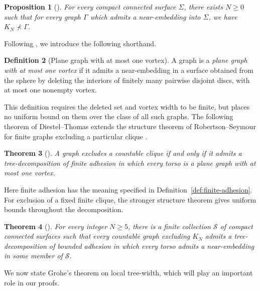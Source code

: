 \documentclass[10pt,a4paper]{amsart}
\newtheorem{theorem}{Theorem}[section]%
\newtheorem{proposition}[theorem]{Proposition}
\theoremstyle{definition}
\newtheorem{definition}[theorem]{Definition}
\begin{document}
\begin{proposition}[{\cite[Lem.~2.3]{diestel1999excluding}}]\label{prop:near-embeddings-exclude-minors}
    For every compact connected surface $\Sigma$, there exists $N \geq 0$ such that for every graph $\Gamma$ which admits a near-embedding into $\Sigma$, we have $K_N \not\prec \Gamma$.
\end{proposition}

Following \cite{diestel1999excluding}, we introduce the following shorthand. 

\begin{definition}[Plane graph with at most one vortex]\label{def:one-vortex}
A graph is a \emph{plane graph with at most one vortex} if it admits a near-embedding in a surface obtained from the sphere by deleting the interiors of finitely many pairwise disjoint discs, with at most one nonempty vortex.
\end{definition}

This definition requires the deleted set and vortex width to be finite, but places no uniform bound on them over the class of all such graphs.
The following theorem of Diestel--Thomas extends the structure theorem of Robertson--Seymour for finite graphs excluding a particular clique \cite{robertson2003graph}.



\begin{theorem}[{\cite[Thm.~3.2]{diestel1999excluding}}]\label{thm:diestel-thomas}
A graph excludes a countable clique if and only if it admits a tree-decomposition of finite adhesion in which every torso is a plane graph with at most one vortex.
\end{theorem}

Here finite adhesion has the meaning specified in Definition~\ref{def:finite-adhesion}.
For exclusion of a fixed finite clique, the stronger structure theorem gives uniform bounds throughout the decomposition.

\begin{theorem}[{\cite[Thm.~3.1, Lem.~2.3]{diestel1999excluding}}]\label{thm:finite-clique-structure}
    For every integer $N \geq 5$, there is a finite collection $\mathcal S$ of compact connected surfaces such that every countable graph excluding $K_N$ admits a tree-decomposition of bounded adhesion in which every torso admits a near-embedding in some member of $\mathcal S$.
\end{theorem}

We now state Grohe's theorem on local tree-width, which will play an important role in our proofs.
\end{document}
